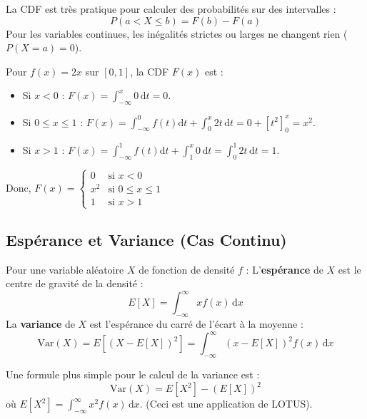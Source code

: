 \begin{remarquebox}
La CDF est très pratique pour calculer des probabilités sur des intervalles :
$$ P(a < X \le b) = F(b) - F(a) $$
Pour les variables continues, les inégalités strictes ou larges ne changent rien ($P(X=a)=0$).
\end{remarquebox}

\begin{examplebox}
Pour $f(x) = 2x$ sur $[0, 1]$, la CDF $F(x)$ est :
\begin{itemize}
    \item Si $x < 0$ : $F(x) = \int_{-\infty}^x 0 \, \mathrm{d}t = 0$.
    \item Si $0 \le x \le 1$ : $F(x) = \int_{-\infty}^0 f(t) \mathrm{d}t + \int_0^x 2t \, \mathrm{d}t = 0 + [t^2]_0^x = x^2$.
    \item Si $x > 1$ : $F(x) = \int_{-\infty}^1 f(t) \mathrm{d}t + \int_1^x 0 \, \mathrm{d}t = \int_0^1 2t \, \mathrm{d}t = 1$.
\end{itemize}
Donc, $F(x) = \begin{cases} 0 & \text{si } x < 0 \\ x^2 & \text{si } 0 \le x \le 1 \\ 1 & \text{si } x > 1 \end{cases}$
\end{examplebox}

\subsection{Espérance et Variance (Cas Continu)}

\begin{definitionbox}
Pour une variable aléatoire $X$ de fonction de densité $f$ :
\newline
L'\textbf{espérance} de $X$ est le centre de gravité de la densité :
$$ E[X] = \int_{-\infty}^{\infty} x f(x) \, \mathrm{d}x $$
La \textbf{variance} de $X$ est l'espérance du carré de l'écart à la moyenne :
$$ \text{Var}(X) = E[(X - E[X])^2] = \int_{-\infty}^{\infty} (x - E[X])^2 f(x) \, \mathrm{d}x $$
\end{definitionbox}

\begin{theorembox}
Une formule plus simple pour le calcul de la variance est :
$$ \text{Var}(X) = E[X^2] - (E[X])^2 $$
où $E[X^2] = \int_{-\infty}^{\infty} x^2 f(x) \, \mathrm{d}x$. (Ceci est une application de LOTUS).
\end{theorembox}

